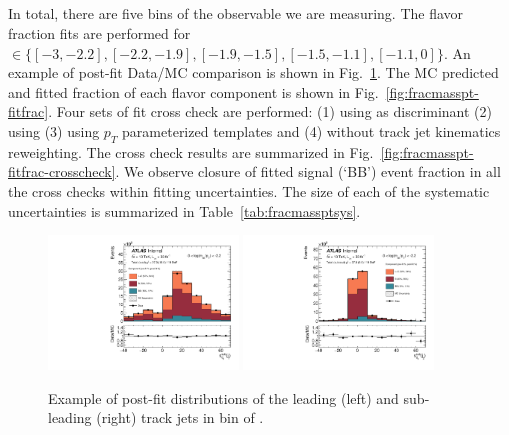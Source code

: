 \clearpage
\subsection{\mpt}

In total, there are five bins of the \mpt observable we are measuring. The flavor fraction fits are performed for \mpt $\in\{[-3, -2.2], [-2.2, -1.9], [-1.9, -1.5], [-1.5, -1.1], [-1.1,0]\}$. An example of post-fit Data/MC comparison is shown in Fig.~\ref{fig:fracmasspt-fit-example}. The MC predicted and fitted fraction of each flavor component is shown in Fig.~\ref{fig:fracmasspt-fitfrac}. Four sets of fit cross check are performed: (1) using \sdzero as discriminant (2) using \subsubsdzero (3) using $p_T$ parameterized templates and (4) without track jet kinematics reweighting. The cross check results are summarized in Fig.~\ref{fig:fracmasspt-fitfrac-crosscheck}. We observe closure of fitted signal (`BB') event fraction in all the cross checks within fitting uncertainties. The size of each of the systematic uncertainties is summarized in Table~\ref{tab:fracmassptsys}.


\begin{figure}[htbp]
  \centering
 \includegraphics[width=0.45\textwidth]{figures/gbb/paperplots/Canv_Fit_M_LpT_INF_SpT_INF_coarse_x}
 \includegraphics[width=0.45\textwidth]{figures/gbb/paperplots/Canv_Fit_b0_25_M_0_3_LpT_INF_SpT_INF_coarse_y}
 \caption{Example of post-fit \subsdzero distributions of the leading (left) and sub-leading (right) track jets in bin of \mpt. }
 \label{fig:fracmasspt-fit-example}
\end{figure}


